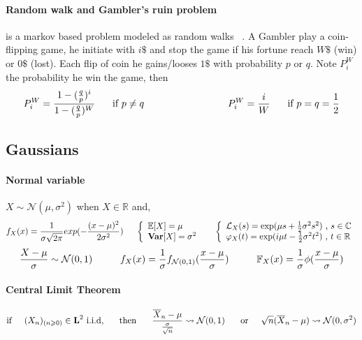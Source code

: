 \documentclass[a4paper,10pt]{article}
\begin{document}
\paragraph{Random walk and Gambler's ruin problem} is a markov based problem modeled as random walks ~\cite{KARL}. A Gambler play a coin-flipping game, he initiate with $i\$$ and stop the game if his fortune reach $W\$$ (win) or $0\$$ (lost). Each flip of coin he gains/looses $1\$$ with probability $p \text{ or } q$. Note $P_i^{W}$ the probability he win the game, then
\[
P_i^{W} = \frac{1- (\frac{q}{p})^i }{1- (\frac{q}{p})^W } \hspace{0.5cm} \text{  if } p\neq q
\hspace{3cm}
P_i^{W} = \frac{i}{W} \hspace{0.5cm}\text{  if } p = q = \frac{1}{2}
\]

\subsection{Gaussians}
\paragraph{Normal variable} $X \sim \mathcal{N}(\mu,\sigma^2)$ when $X \in \mathbb{R}$ and,
\[
f_{X}(x) = \frac{1}{\sigma \sqrt{2\pi}} exp (-\frac{(x-\mu)^2}{2\sigma^2})
\hspace{5mm}
\left\{
\begin{array}{l}
\mathbb{E}[X]=\mu \\
\textbf{Var}[X]=\sigma^2
\end{array}\right.
\hspace{5mm}
\left\{
\begin{array}{l}
\mathcal{L}_{X}(s) =  \text{exp}(\mu s  + \frac{1}{2} \sigma^2 s^2) \hbox{ , } s\in\mathbb{C} \\
\varphi_{X}(t)     =  \text{exp}(i\mu t - \frac{1}{2} \sigma^2 t^2) \hbox{ , } t\in\mathbb{R}
\end{array}\right.
\]
\[
\frac{X - \mu}{\sigma} \sim \mathcal{N}(0,1)
\hspace{10mm}
f_{X}(x) = \frac{1}{\sigma}f_{\mathcal{N}(0,1)}(\frac{x-\mu}{\sigma})
\hspace{10mm}
\mathbb{F}_{X}(x) = \frac{1}{\sigma}\phi(\frac{x-\mu}{\sigma})
\]
\paragraph{Central Limit Theorem}
\[
\text{if} \hspace{5mm} (X_{n})_{(n\geqslant 0)} \in \textbf{L}^2 \text{  i.i.d,} \hspace{5mm} \text{ then  } \hspace{5mm}
\frac{\overline{X}_n - \mu}{\frac{\sigma}{\sqrt{n}}} \rightsquigarrow   \mathcal{N}(0,1)
 \hspace{5mm}  \text{    or} \hspace{5mm}  
\sqrt{n}(\overline{X}_n - \mu) \rightsquigarrow   \mathcal{N}(0,\sigma^{2})
\]
\end{document}
